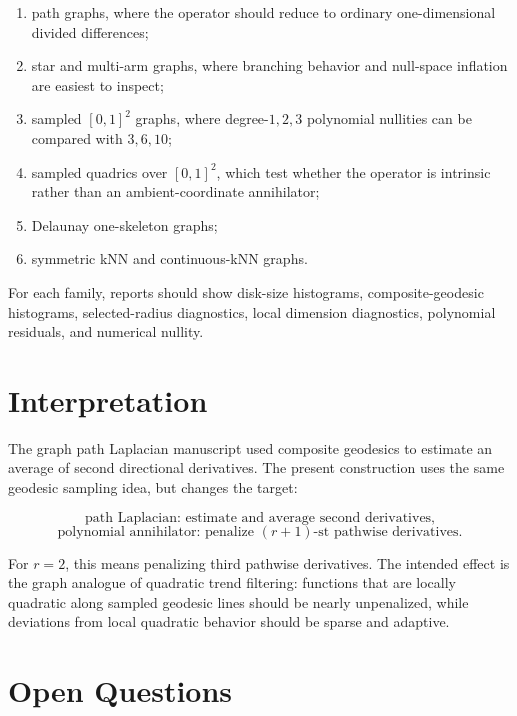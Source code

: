 \documentclass[11pt]{article}
\begin{document}
\begin{enumerate}
  \item path graphs, where the operator should reduce to ordinary
        one-dimensional divided differences;
  \item star and multi-arm graphs, where branching behavior and null-space
        inflation are easiest to inspect;
  \item sampled \([0,1]^2\) graphs, where degree-\(1,2,3\) polynomial nullities
        can be compared with \(3,6,10\);
  \item sampled quadrics over \([0,1]^2\), which test whether the operator is
        intrinsic rather than an ambient-coordinate annihilator;
  \item Delaunay one-skeleton graphs;
  \item symmetric kNN and continuous-kNN graphs.
\end{enumerate}

For each family, reports should show disk-size histograms, composite-geodesic
histograms, selected-radius diagnostics, local dimension diagnostics,
polynomial residuals, and numerical nullity.

\section{Interpretation}

The graph path Laplacian manuscript used composite geodesics to estimate an
average of second directional derivatives.  The present construction uses the
same geodesic sampling idea, but changes the target:

\[
\text{path Laplacian: estimate and average second derivatives,}
\]
\[
\text{polynomial annihilator: penalize \((r+1)\)-st pathwise derivatives.}
\]

For \(r=2\), this means penalizing third pathwise derivatives.  The intended
effect is the graph analogue of quadratic trend filtering: functions that are
locally quadratic along sampled geodesic lines should be nearly unpenalized,
while deviations from local quadratic behavior should be sparse and adaptive.

\section{Open Questions}
\end{document}
